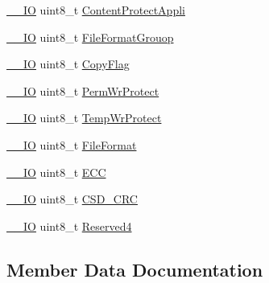 \begin{DoxyCompactItemize}
\mbox{\hyperlink{core__sc300_8h_aec43007d9998a0a0e01faede4133d6be}{\+\_\+\+\_\+\+IO}} uint8\+\_\+t \mbox{\hyperlink{struct_h_a_l___s_d___card_c_s_d_type_def_a6bacd6337e20ac7647c6f1996ae1581f}{Content\+Protect\+Appli}}
\item 
\mbox{\hyperlink{core__sc300_8h_aec43007d9998a0a0e01faede4133d6be}{\+\_\+\+\_\+\+IO}} uint8\+\_\+t \mbox{\hyperlink{struct_h_a_l___s_d___card_c_s_d_type_def_a3f4c4668168e92e6aef15a9f47cf5629}{File\+Format\+Grouop}}
\item 
\mbox{\hyperlink{core__sc300_8h_aec43007d9998a0a0e01faede4133d6be}{\+\_\+\+\_\+\+IO}} uint8\+\_\+t \mbox{\hyperlink{struct_h_a_l___s_d___card_c_s_d_type_def_a85841cbabdbfc1d6808aba01db946727}{Copy\+Flag}}
\item 
\mbox{\hyperlink{core__sc300_8h_aec43007d9998a0a0e01faede4133d6be}{\+\_\+\+\_\+\+IO}} uint8\+\_\+t \mbox{\hyperlink{struct_h_a_l___s_d___card_c_s_d_type_def_ae30b9694cf7bcb2017350cc22b117986}{Perm\+Wr\+Protect}}
\item 
\mbox{\hyperlink{core__sc300_8h_aec43007d9998a0a0e01faede4133d6be}{\+\_\+\+\_\+\+IO}} uint8\+\_\+t \mbox{\hyperlink{struct_h_a_l___s_d___card_c_s_d_type_def_a7eaf72d52a29bfea751cbea85786ba78}{Temp\+Wr\+Protect}}
\item 
\mbox{\hyperlink{core__sc300_8h_aec43007d9998a0a0e01faede4133d6be}{\+\_\+\+\_\+\+IO}} uint8\+\_\+t \mbox{\hyperlink{struct_h_a_l___s_d___card_c_s_d_type_def_a96be9a95189a24f34eac8daf28da80a6}{File\+Format}}
\item 
\mbox{\hyperlink{core__sc300_8h_aec43007d9998a0a0e01faede4133d6be}{\+\_\+\+\_\+\+IO}} uint8\+\_\+t \mbox{\hyperlink{struct_h_a_l___s_d___card_c_s_d_type_def_a8991c0e5e94ad2a7011ac8a79df18321}{E\+CC}}
\item 
\mbox{\hyperlink{core__sc300_8h_aec43007d9998a0a0e01faede4133d6be}{\+\_\+\+\_\+\+IO}} uint8\+\_\+t \mbox{\hyperlink{struct_h_a_l___s_d___card_c_s_d_type_def_aac6c59f0170b6603b4ba95b46aab3dbf}{C\+S\+D\+\_\+\+C\+RC}}
\item 
\mbox{\hyperlink{core__sc300_8h_aec43007d9998a0a0e01faede4133d6be}{\+\_\+\+\_\+\+IO}} uint8\+\_\+t \mbox{\hyperlink{struct_h_a_l___s_d___card_c_s_d_type_def_ace603f05470b87f1fa798a8b2e380016}{Reserved4}}
\end{DoxyCompactItemize}


\subsection{Member Data Documentation}
\mbox{\label{struct_h_a_l___s_d___card_c_s_d_type_def_a7f9634f4002f2e45c6d681260bea90d3}} 
